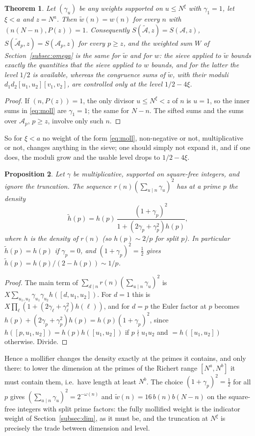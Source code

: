 \documentclass[11pt]{amsart}
\newtheorem{theorem}{Theorem}[section]
\newtheorem{proposition}[theorem]{Proposition}
\theoremstyle{remark}
\newcommand{\cA}{\mathcal{A}}
\begin{document}
\begin{theorem}\label{thm:nothing}
Let $(\gamma_u)$ be any weights supported on $u\le N^\xi$ with $\gamma_1=1$, let $\xi<a$ and $z=N^a$. Then $\tilde w(n)=w(n)$ for every $n$ with $(n(N-n),P(z))=1$. Consequently $S(\tilde{\cA},z)=S(\cA,z)$, $S(\tilde{\cA}_p,z)=S(\cA_p,z)$ for every $p\ge z$, and the weighted sum $W$ of Section~\ref{subsec:omega} is the same for $\tilde w$ and for $w$: the sieve applied to $\tilde w$ bounds exactly the quantities that the sieve applied to $w$ bounds, and for the latter the level $1/2$ is available, whereas the congruence sums of $\tilde w$, with their moduli $d_1d_2[u_1,u_2][v_1,v_2]$, are controlled only at the level $1/2-4\xi$.
\end{theorem}
\begin{proof}
If $(n,P(z))=1$, the only divisor $u\le N^\xi<z$ of $n$ is $u=1$, so the inner sums in \eqref{eq:moll} are $\gamma_1=1$; the same for $N-n$. The sifted sums and the sums over $\cA_p$, $p\ge z$, involve only such $n$.
\end{proof}
So for $\xi<a$ no weight of the form \eqref{eq:moll}, non-negative or not, multiplicative or not, changes anything in the sieve; one should simply not expand it, and if one does, the moduli grow and the usable level drops to $1/2-4\xi$.

\begin{proposition}\label{prop:density}
Let $\gamma$ be multiplicative, supported on square-free integers, and ignore the truncation. The sequence $r(n)(\sum_{u\mid n}\gamma_u)^2$ has at a prime $p$ the density
\[
\tilde h(p)=h(p)\,\frac{(1+\gamma_p)^2}{1+(2\gamma_p+\gamma_p^2)h(p)},
\]
where $h$ is the density of $r(n)$ (so $h(p)\sim2/p$ for split $p$). In particular $\tilde h(p)=h(p)$ if $\gamma_p=0$, and $(1+\gamma_p)^2=\frac12$ gives $\tilde h(p)=h(p)/(2-h(p))\sim1/p$.
\end{proposition}
\begin{proof}
The main term of $\sum_{d\mid n}r(n)(\sum_{u\mid n}\gamma_u)^2$ is $X\sum_{u_1,u_2}\gamma_{u_1}\gamma_{u_2}h([d,u_1,u_2])$. For $d=1$ this is $X\prod_\ell(1+(2\gamma_\ell+\gamma_\ell^2)h(\ell))$, and for $d=p$ the Euler factor at $p$ becomes $h(p)+(2\gamma_p+\gamma_p^2)h(p)=h(p)(1+\gamma_p)^2$, since $h([p,u_1,u_2])=h(p)h([u_1,u_2])$ if $p\nmid u_1u_2$ and $=h([u_1,u_2])$ otherwise. Divide.
\end{proof}

Hence a mollifier changes the density exactly at the primes it contains, and only there: to lower the dimension at the primes of the Richert range $[N^a,N^b]$ it must contain them, i.e.\ have length at least $N^b$. The choice $(1+\gamma_p)^2=\frac12$ for all $p$ gives $(\sum_{u\mid n}\gamma_u)^2=2^{-\omega(n)}$ and $\tilde w(n)=16\,b(n)b(N-n)$ on the square-free integers with split prime factors: the fully mollified weight is the indicator weight of Section~\ref{subsec:dim}, as it must be, and the truncation at $N^\xi$ is precisely the trade between dimension and level.
\end{document}
